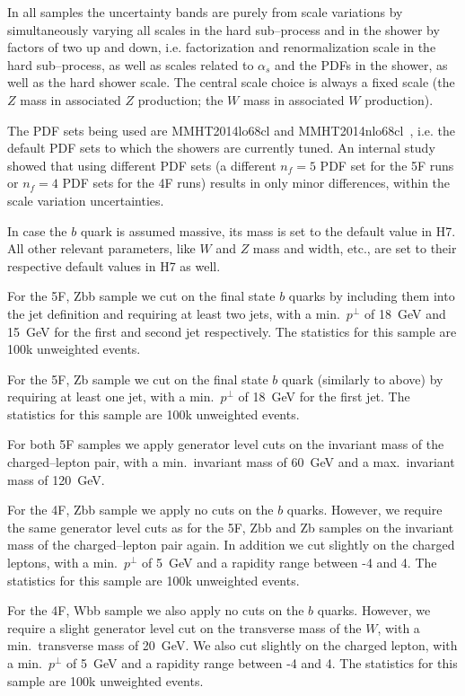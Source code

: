 \documentclass[11pt]{cernrep}
\newcommand{\Herwig}{H\protect\scalebox{0.8}{ERWIG}7\xspace}
\begin{document}
\medskip

In all samples the uncertainty bands are purely from scale variations by
simultaneously varying all scales in the hard sub--process and in the shower by
factors of two up and down, i.e. factorization and renormalization scale in the
hard sub--process, as well as scales related to $\alpha_s$ and the PDFs
in the shower, as well as the hard shower scale. The central scale
choice is always a fixed scale (the $Z$ mass in associated $Z$ production; the
$W$ mass in associated $W$ production).

The PDF sets being used are MMHT2014lo68cl and
MMHT2014nlo68cl~\cite{Harland-Lang:2014zoa}, i.e. the default PDF sets
to which the showers are currently tuned. An internal study showed that using
different PDF sets (a different $n_f\!\!=\!\!5$ PDF set for the 5F runs or
$n_f\!\!=\!\!4$ PDF sets for the 4F runs) results in only minor differences,
within the scale variation uncertainties.

In case the $b$ quark is assumed massive, its mass is set to the default value
in \Herwig. All other relevant parameters, like $W$ and $Z$ mass and width,
etc., are set to their respective default values in \Herwig as well.

For the 5F, Zbb sample we cut on the final state $b$ quarks by including them
into the jet definition and requiring at least two jets,
with a min.~$p^\bot$ of 18~GeV and 15~GeV for the first and second jet
respectively. The statistics for this sample are 100k unweighted events.

For the 5F, Zb sample we cut on the final state $b$ quark (similarly to above)
by requiring at least one jet, with a min.~$p^\bot$ of 18~GeV for the first jet.
The statistics for this sample are 100k unweighted events.

For both 5F samples we apply generator level cuts on the invariant mass of the
charged--lepton pair, with a min.~invariant mass of 60~GeV and a max.~invariant
mass of 120~GeV.

For the 4F, Zbb sample we apply no cuts on the $b$ quarks. However, we require
the same generator level cuts as for the 5F, Zbb and Zb samples on the invariant
mass of the charged--lepton pair again. In addition we cut slightly on the
charged leptons, with a min.~$p^\bot$ of 5~GeV and a rapidity range between -4
and 4. The statistics for this sample are 100k unweighted events.

For the 4F, Wbb sample we also apply no cuts on the $b$ quarks. However, we
require a slight generator level cut on the transverse mass of the $W$, with a
min.~transverse mass of 20~GeV. We also cut slightly on the charged lepton, with
a min.~$p^\bot$ of 5~GeV and a rapidity range between -4 and 4. The statistics
for this sample are 100k unweighted events.
\end{document}
